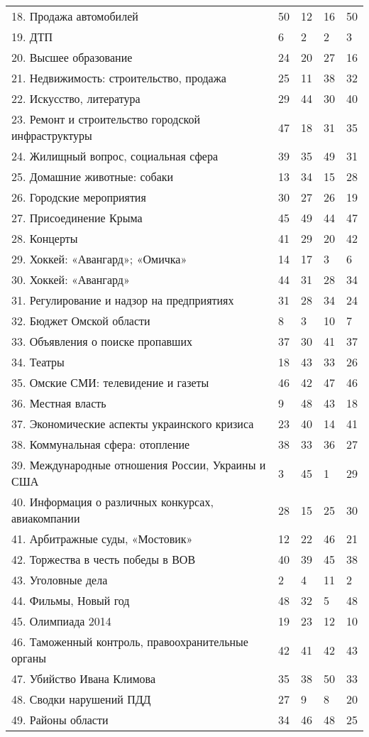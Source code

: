 \begin{longtable}[c]{| C{7cm} | R{2cm} | R{2cm} | R{2cm} | R{2cm} | }
18. Продажа автомобилей & 50 & 12 & 16 & 50 \\
19. ДТП & 6 & 2 & 2 & 3 \\
20. Высшее образование & 24 & 20 & 27 & 16 \\
21. Недвижимость: строительство, продажа & 25 & 11 & 38 & 32 \\
22. Искусство, литература & 29 & 44 & 30 & 40 \\
23. Ремонт и строительство городской инфраструктуры & 47 & 18 & 31 & 35 \\
24. Жилищный вопрос, социальная сфера & 39 & 35 & 49 & 31 \\
25. Домашние животные: собаки & 13 & 34 & 15 & 28 \\
26. Городские мероприятия & 30 & 27 & 26 & 19 \\
27. Присоединение Крыма & 45 & 49 & 44 & 47 \\
28. Концерты & 41 & 29 & 20 & 42 \\
29. Хоккей: «Авангард»; «Омичка» & 14 & 17 & 3 & 6 \\
30. Хоккей: «Авангард» & 44 & 31 & 28 & 34 \\
31. Регулирование и надзор на предприятиях & 31 & 28 & 34 & 24 \\
32. Бюджет Омской области & 8 & 3 & 10 & 7 \\
33. Объявления о поиске пропавших & 37 & 30 & 41 & 37 \\
34. Театры & 18 & 43 & 33 & 26 \\
35. Омские СМИ: телевидение и газеты & 46 & 42 & 47 & 46 \\
36. Местная власть & 9 & 48 & 43 & 18 \\
37. Экономические аспекты украинского кризиса & 23 & 40 & 14 & 41 \\
38. Коммунальная сфера: отопление & 38 & 33 & 36 & 27 \\
39. Международные отношения России, Украины и США & 3 & 45 & 1 & 29 \\
40. Информация о различных конкурсах, авиакомпании & 28 & 15 & 25 & 30 \\
41. Арбитражные суды, «Мостовик» & 12 & 22 & 46 & 21 \\
42. Торжества в честь победы в ВОВ & 40 & 39 & 45 & 38 \\
43. Уголовные дела & 2 & 4 & 11 & 2 \\
44. Фильмы, Новый год & 48 & 32 & 5 & 48 \\
45. Олимпиада 2014 & 19 & 23 & 12 & 10 \\
46. Таможенный контроль, правоохранительные органы & 42 & 41 & 42 & 43 \\
47. Убийство Ивана Климова & 35 & 38 & 50 & 33 \\
48. Сводки нарушений ПДД & 27 & 9 & 8 & 20 \\
49. Районы области & 34 & 46 & 48 & 25 \\
	\hline
\end{longtable}

